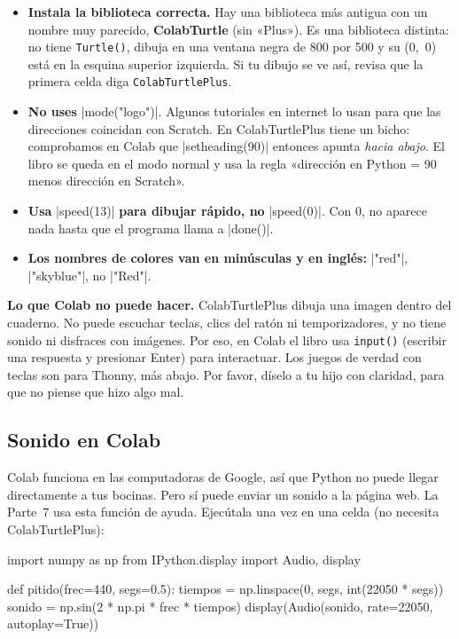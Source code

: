 \begin{watchout}
\begin{itemize}[leftmargin=*]
  \item \textbf{Instala la biblioteca correcta.} Hay una biblioteca más antigua con un nombre muy parecido, \textbf{ColabTurtle} (sin «Plus»). Es una biblioteca distinta: no tiene \texttt{Turtle()}, dibuja en una ventana negra de 800 por 500 y su (0,~0) está en la esquina superior izquierda. Si tu dibujo se ve así, revisa que la primera celda diga \texttt{ColabTurtlePlus}.
  \item \textbf{No uses} \py|mode("logo")|. Algunos tutoriales en internet lo usan para que las direcciones coincidan con Scratch. En ColabTurtlePlus tiene un bicho: comprobamos en Colab que \py|setheading(90)| entonces apunta \emph{hacia abajo}. El libro se queda en el modo normal y usa la regla «dirección en Python = 90 menos dirección en Scratch».
  \item \textbf{Usa} \py|speed(13)| \textbf{para dibujar rápido, no} \py|speed(0)|. Con 0, no aparece nada hasta que el programa llama a \py|done()|.
  \item \textbf{Los nombres de colores van en minúsculas y en inglés:} \py|"red"|, \py|"skyblue"|, no \py|"Red"|.
\end{itemize}
\end{watchout}

\textbf{Lo que Colab no puede hacer.} ColabTurtlePlus dibuja una imagen dentro del cuaderno. No puede escuchar teclas, clics del ratón ni temporizadores, y no tiene sonido ni disfraces con imágenes. Por eso, en Colab el libro usa \texttt{input()} (escribir una respuesta y presionar Enter) para interactuar. Los juegos de verdad con teclas son para Thonny, más abajo. Por favor, díselo a tu hijo con claridad, para que no piense que hizo algo mal.

\subsection*{Sonido en Colab}

Colab funciona en las computadoras de Google, así que Python no puede llegar directamente a tus bocinas. Pero sí puede enviar un sonido a la página web. La Parte~7 usa esta función de ayuda. Ejecútala una vez en una celda (no necesita ColabTurtlePlus):

\begin{code}
import numpy as np
from IPython.display import Audio, display

def pitido(frec=440, segs=0.5):
    tiempos = np.linspace(0, segs, int(22050 * segs))
    sonido = np.sin(2 * np.pi * frec * tiempos)
    display(Audio(sonido, rate=22050, autoplay=True))
\end{code}

